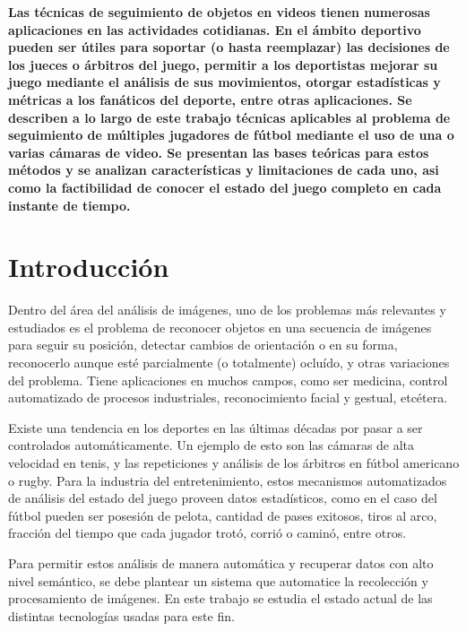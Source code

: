 \documentclass[a4paper,10pt]{article}
\title{}
\date{20 de Septiembre de 2013}
\author{Civile, Juan Pablo \and Crespo, Álvaro \and Ordano, Esteban }
\begin{document}
\pagestyle{fancy}
\maketitle
\thispagestyle{fancy}

\begin{customabstract}
\textbf{
Las técnicas de seguimiento de objetos en videos tienen numerosas aplicaciones
en las actividades cotidianas. En el ámbito deportivo pueden ser útiles para
soportar (o hasta reemplazar) las decisiones de los jueces o árbitros del
juego, permitir a los deportistas mejorar su juego mediante el análisis de sus
movimientos, otorgar estadísticas y métricas a los fanáticos del deporte, entre
otras aplicaciones. Se describen a lo largo de este trabajo técnicas aplicables
al problema de seguimiento de múltiples jugadores de fútbol mediante el uso de
una o varias cámaras de video. Se presentan las bases teóricas para estos
métodos y se analizan características y limitaciones de cada uno, asi como la
factibilidad de conocer el estado del juego completo en cada instante de tiempo.
} \end{customabstract}

\part*{Introducción}

Dentro del área del análisis de imágenes, uno de los problemas más relevantes y
estudiados es el problema de reconocer objetos en una secuencia de
imágenes para seguir su posición, detectar cambios de orientación o en su
forma, reconocerlo aunque esté parcialmente (o totalmente) ocluído, y otras
variaciones del problema. Tiene aplicaciones en muchos campos, como ser
medicina, control automatizado de procesos industriales, reconocimiento facial
y gestual, etcétera.

Existe una tendencia en los deportes en las últimas décadas por pasar a ser
controlados automáticamente. Un ejemplo de esto son las cámaras de alta
velocidad en tenis, y las repeticiones y análisis de los árbitros en fútbol
americano o rugby. Para la industria del entretenimiento, estos
mecanismos automatizados de análisis del estado del juego proveen datos
estadísticos, como en el caso del fútbol pueden ser posesión de pelota, cantidad
de pases exitosos, tiros al arco, fracción del tiempo que cada jugador trotó,
corrió o caminó, entre otros.

Para permitir estos análisis de manera automática y recuperar datos con alto
nivel semántico, se debe plantear un sistema que automatice la recolección
y procesamiento de imágenes. En este trabajo se estudia el estado
actual de las distintas tecnologías usadas para este fin.
\end{document}
